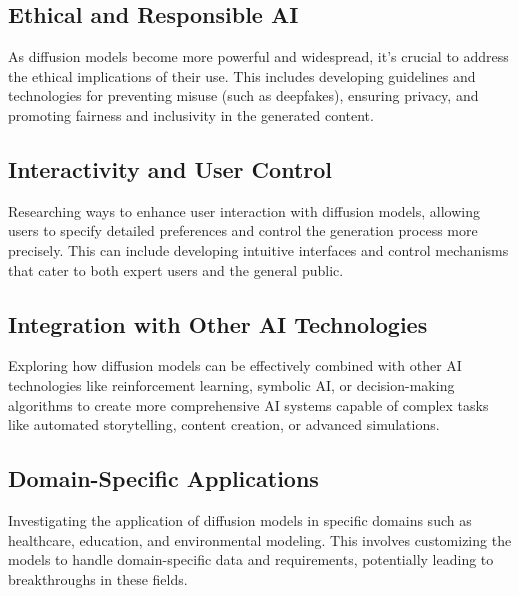 \subsection{Ethical and Responsible AI}
As diffusion models become more powerful and widespread, it's crucial to address the ethical implications of their use. This includes developing guidelines and technologies for preventing misuse (such as deepfakes), ensuring privacy, and promoting fairness and inclusivity in the generated content.
\subsection{Interactivity and User Control}
Researching ways to enhance user interaction with diffusion models, allowing users to specify detailed preferences and control the generation process more precisely. This can include developing intuitive interfaces and control mechanisms that cater to both expert users and the general public.
\subsection{Integration with Other AI Technologies}
Exploring how diffusion models can be effectively combined with other AI technologies like reinforcement learning, symbolic AI, or decision-making algorithms to create more comprehensive AI systems capable of complex tasks like automated storytelling, content creation, or advanced simulations.
\subsection{Domain-Specific Applications}
Investigating the application of diffusion models in specific domains such as healthcare, education, and environmental modeling. This involves customizing the models to handle domain-specific data and requirements, potentially leading to breakthroughs in these fields.

